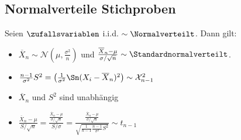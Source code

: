 \subsection*{Normalverteile Stichproben}
Seien $\zufallsvariablen$ i.i.d. $\sim \Normalverteilt$. Dann gilt:
\begin{itemize}
  \item $\overline{X}_n \sim \mathcal{N} (\mu, \frac{\sigma^2}{n})$
        und $\frac{\overline{X}_n - \mu}{\sigma / \sqrt{n}} \sim \Standardnormalverteilt$.
  \item $\frac{n-1}{\sigma^2} S^2 = \left( \frac{1}{\sigma^2} \Sn  (X_i - \overline{X}_n)^2 \right) \sim \mathcal{X}^2_{n-1}$
  \item $\overline{X}_n$ und $S^2$ sind unabhängig
  \item $\frac{\overline{X}_n - \mu}{S / \sqrt{n}} = \frac{ \frac{\overline{X}_n - \mu}{\sigma / \sqrt{n}} }{S / \sigma} = \frac{ \frac{\overline{X}_n - \mu}{\sigma / \sqrt{n}} }{\sqrt{\frac{1}{n-1} \frac{n-1}{\sigma^2} S^2}} \sim t_{n-1}$
\end{itemize}